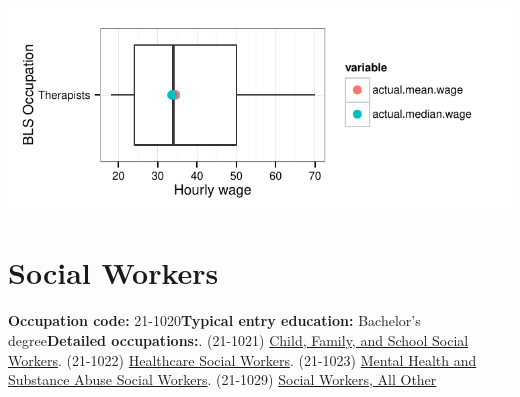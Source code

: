 \documentclass[a4paper,10pt]{article}\usepackage[]{graphicx}\usepackage[]{color}
\makeatletter
\def\maxwidth{ %
  \ifdim\Gin@nat@width>\linewidth
    \linewidth
  \else
    \Gin@nat@width
  \fi
}
\makeatother
\begin{document}
{\centering \includegraphics[width=\maxwidth]{figure/unnamed-chunk-253} 

}


\newpage\section{Social Workers}\textbf{Occupation code:} 21-1020\newline\textbf{Typical entry education:} Bachelor's degree\newline\textbf{Detailed occupations:}. (21-1021)  \href{http://www.bls.gov/oes/current/oes211021.htm}{Child, Family, and School Social Workers}. (21-1022)  \href{http://www.bls.gov/oes/current/oes211022.htm}{Healthcare Social Workers}. (21-1023)  \href{http://www.bls.gov/oes/current/oes211023.htm}{Mental Health and Substance Abuse Social Workers}. (21-1029)  \href{http://www.bls.gov/oes/current/oes211029.htm}{Social Workers, All Other}\newline%
\end{document}
